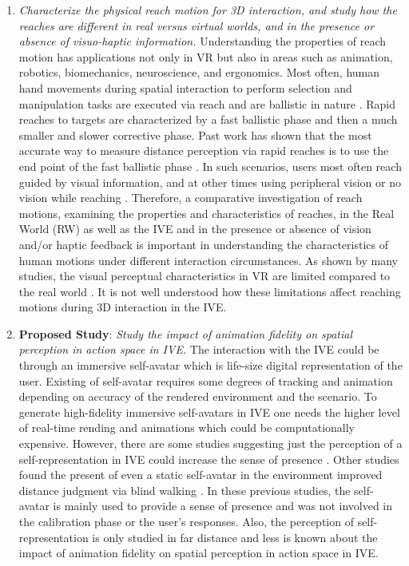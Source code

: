 \begin{enumerate}
	\item \textit{Characterize the physical reach motion for 3D interaction, and study how the reaches are different in real versus virtual worlds, and in the presence or absence of visuo-haptic information.} Understanding the properties of reach motion has applications not only in VR but also in areas such as animation, robotics, biomechanics, neuroscience, and ergonomics. Most often, human hand movements during spatial interaction to perform selection and manipulation tasks are executed via reach and are ballistic in nature \cite{ts55}. Rapid reaches to targets are characterized by a fast ballistic phase and then a much smaller and slower corrective phase. Past work has shown that the most accurate way to measure distance perception via rapid reaches is to use the end point of the fast ballistic phase \cite{BP98}. In such scenarios, users most often reach guided by visual information, and at other times using peripheral vision or no vision while reaching \cite{ss98}. Therefore, a comparative investigation of reach motions, examining the properties and characteristics of reaches, in the Real World (RW) as well as the IVE and in the presence or absence of vision and/or haptic feedback is important in understanding the characteristics of human motions under different interaction circumstances. As shown by many studies, the visual perceptual characteristics in VR are limited compared to the real world \cite{lk03}. It is not well understood how these limitations affect reaching motions during 3D interaction in the IVE.
	
	\item \textbf{Proposed Study}: \textit{Study the impact of animation fidelity on spatial perception in action space in IVE.} The interaction with the IVE could be through an immersive self-avatar which is life-size digital representation of the user. Existing of self-avatar requires some degrees of tracking and animation depending on accuracy of the rendered environment and the scenario. To generate high-fidelity immersive self-avatars in IVE one needs the higher level of real-time rending and animations which could be computationally expensive. However, there are some studies suggesting just the perception of a self-representation in IVE could increase the sense of presence \cite{LNW+03}. Other studies found the present of even a static self-avatar in the environment improved distance judgment via blind walking \cite{RIK+08,MCW+10}. In these previous studies, the self-avatar is mainly used to provide a sense of presence and was not involved in the calibration phase or the user's responses. Also, the perception of self-representation is only studied in far distance and less is known about the impact of animation fidelity on spatial perception in action space in IVE.
\end{enumerate}
















